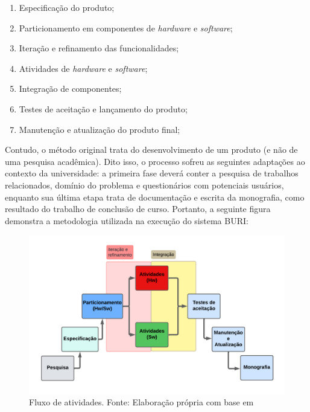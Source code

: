 \begin{enumerate}
    \item Especificação do produto;
    \item Particionamento em componentes de \textit{hardware} e \textit{software};
    \item Iteração e refinamento das funcionalidades;
    \item Atividades de \textit{hardware} e \textit{software};
    \item Integração de componentes;
    \item Testes de aceitação e lançamento do produto;
    \item Manutenção e atualização do produto final;
\end{enumerate}

Contudo, o método original trata do desenvolvimento de um produto (e não de uma pesquisa acadêmica). Dito isso, o processo sofreu as seguintes 
adaptações ao contexto da universidade: a primeira fase deverá conter a pesquisa de trabalhos relacionados, domínio do problema e questionários com potenciais usuários, enquanto sua última etapa trata de documentação e escrita 
da monografia, como resultado do trabalho de conclusão de curso. Portanto, a seguinte figura demonstra a metodologia utilizada na execução do sistema BURI: 

\begin{figure}[ht]
\centering
\includegraphics[width=.75\textwidth]{img/diagrama-metodologia.png}
\caption{Fluxo de atividades. Fonte: Elaboração própria com base  em \cite{system-design-IOT}}\label{figMetodologia}
\end{figure}

